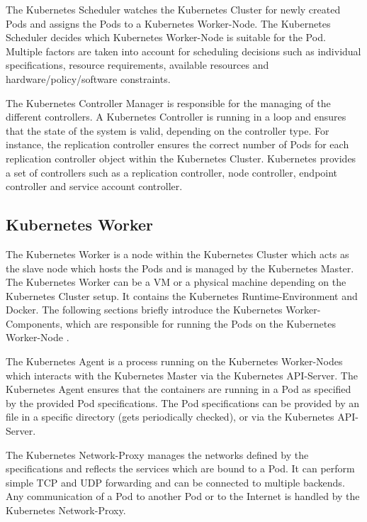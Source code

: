 The Kubernetes Scheduler watches the Kubernetes Cluster for newly created Pods and assigns the Pods to a Kubernetes Worker-Node. The Kubernetes Scheduler decides which Kubernetes Worker-Node is suitable for the Pod. Multiple factors are taken into account for scheduling decisions such as individual specifications, resource requirements, available resources and hardware/policy/software constraints.

The Kubernetes Controller Manager is responsible for the managing of the different controllers. A Kubernetes Controller is running in a loop and ensures that the state of the system is valid, depending on the controller type. For instance, the replication controller ensures the correct number of Pods for each replication controller object within the Kubernetes Cluster. Kubernetes provides a set of controllers such as a replication controller, node controller, endpoint controller and service account controller.

\subsection{Kubernetes Worker}
\label{sec:caas-kubernetes-worker}
The Kubernetes Worker is a node within the Kubernetes Cluster which acts as the slave node which hosts the Pods and is managed by the Kubernetes Master. The Kubernetes Worker can be a VM or a physical machine depending on the Kubernetes Cluster setup. It contains the Kubernetes Runtime-Environment and Docker. The following sections briefly introduce the Kubernetes Worker-Components, which are responsible for running the Pods on the Kubernetes Worker-Node \cite{CNCFKubernetesComponents2018}. 

The Kubernetes Agent is a process running on the Kubernetes Worker-Nodes which interacts with the Kubernetes Master via the Kubernetes API-Server. The Kubernetes Agent ensures that the containers are running in a Pod as specified by the provided Pod specifications. The Pod specifications can be provided by an file in a specific directory (gets periodically checked), or via the Kubernetes API-Server.

The Kubernetes Network-Proxy manages the networks defined by the specifications and reflects the services which are bound to a Pod. It can perform simple TCP and UDP forwarding and can be connected to multiple backends. Any communication of a Pod to another Pod or to the Internet is handled by the Kubernetes Network-Proxy. 

